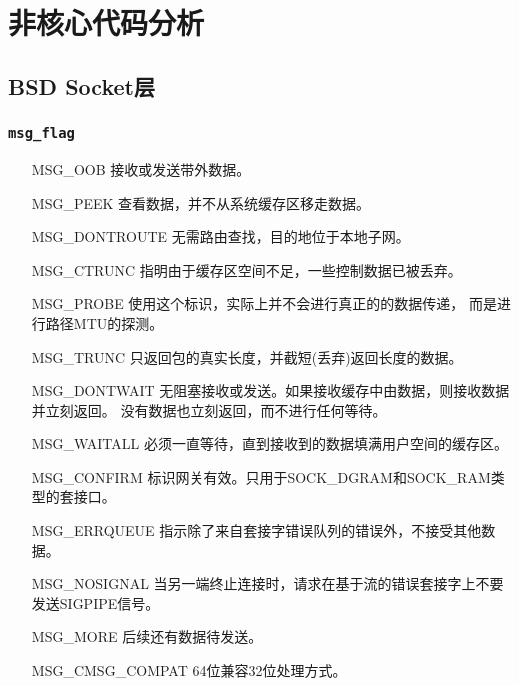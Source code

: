 \chapter{非核心代码分析}

\minitoc

    \section{BSD Socket层}
        \subsection{\texttt{msg_flag}}
\begin{enumerate}
\item[MSG\_OOB]         接收或发送带外数据。
\item[MSG\_PEEK]        查看数据，并不从系统缓存区移走数据。
\item[MSG\_DONTROUTE]   无需路由查找，目的地位于本地子网。
\item[MSG\_CTRUNC]      指明由于缓存区空间不足，一些控制数据已被丢弃。
\item[MSG\_PROBE]       使用这个标识，实际上并不会进行真正的的数据传递，
                        而是进行路径MTU的探测。
\item[MSG\_TRUNC]       只返回包的真实长度，并截短(丢弃)返回长度的数据。
\item[MSG\_DONTWAIT]    无阻塞接收或发送。如果接收缓存中由数据，则接收数据并立刻返回。
                        没有数据也立刻返回，而不进行任何等待。
\item[MSG\_WAITALL]     必须一直等待，直到接收到的数据填满用户空间的缓存区。
\item[MSG\_CONFIRM]     标识网关有效。只用于SOCK\_DGRAM和SOCK\_RAM类型的套接口。
\item[MSG\_ERRQUEUE]    指示除了来自套接字错误队列的错误外，不接受其他数据。
\item[MSG\_NOSIGNAL]    当另一端终止连接时，请求在基于流的错误套接字上不要发送SIGPIPE信号。
\item[MSG\_MORE]        后续还有数据待发送。
\item[MSG\_CMSG\_COMPAT]64位兼容32位处理方式。
\end{enumerate}
